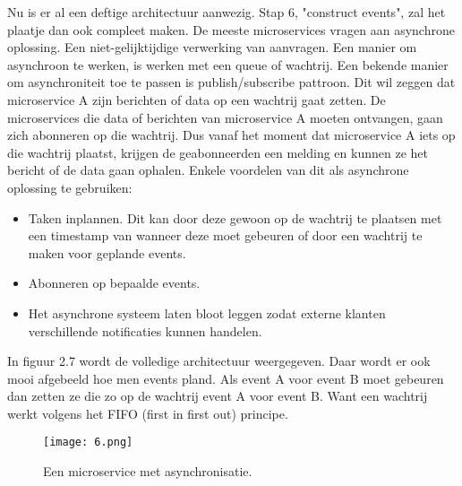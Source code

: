 Nu is er al een deftige architectuur aanwezig. Stap 6, "construct events", zal het plaatje dan ook compleet maken. De meeste microservices vragen aan asynchrone oplossing. Een niet-gelijktijdige verwerking van aanvragen. Een manier om asynchroon te werken, is werken met een queue of wachtrij. Een bekende manier om asynchroniteit toe te passen is publish/subscribe pattroon. Dit wil zeggen dat microservice A zijn berichten of data op een wachtrij gaat zetten. De microservices die data of berichten van microservice A moeten ontvangen, gaan zich abonneren op die wachtrij. Dus vanaf het moment dat microservice A iets op die wachtrij plaatst, krijgen de geabonneerden een melding en kunnen ze het bericht of de data gaan ophalen. Enkele voordelen van dit als asynchrone oplossing te gebruiken:
\begin{itemize}
	\item Taken inplannen. Dit kan door deze gewoon op de wachtrij te plaatsen met een timestamp van wanneer deze moet gebeuren of door een wachtrij te maken voor geplande events.
	\item Abonneren op bepaalde events.
	\item Het asynchrone systeem laten bloot leggen zodat externe klanten verschillende notificaties kunnen handelen.
\end{itemize}
In figuur 2.7 wordt de volledige architectuur weergegeven. Daar wordt er ook mooi afgebeeld hoe men events pland. Als event A voor event B moet gebeuren dan zetten ze die zo op de wachtrij event A voor event B. Want een wachtrij werkt volgens het FIFO (first in first out) principe.
\begin{figure}[h]
	\texttt{[image: 6.png]}
	\caption{Een microservice met asynchronisatie. \textcite{Benetis2016}}
	\centering
\end{figure}

